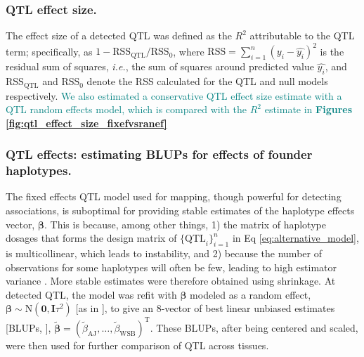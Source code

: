 \documentclass[9pt,twocolumn,twoside]{gsajnl}
\newcommand{\ie}{\emph{i.e.}\xspace}
\newcommand{\T}{^\mathrm{T}}
\newcommand{\bbeta}{\boldsymbol{\beta}}
\newcommand{\blup}{\widetilde{\bbeta}}
\newcommand{\bzero}{\mathbf{0}}
\newcommand{\bI}{\mathbf{I}}
\newcommand{\tausq}{\tau^{2}}
\newcommand{\WV}[2]{\textcolor{red}{#1\footnote{\textcolor{red}{WV: #2}}}}
\newcommand{\GKinline}[1]{\textcolor{teal}{#1}}
\begin{document}

\subsubsection{QTL effect size.}

The effect size of a detected QTL was defined as the $R^2$ attributable to the QTL term; specifically, as $1-\text{RSS}_\text{QTL} / \text{RSS}_0$, where $\text{RSS} = \sum_{i = 1}^{n}(y_{i} - \widehat{y_{i}})^{2}$ is the residual sum of squares, \ie, the sum of squares around predicted value $\widehat{y_i}$, and $\text{RSS}_{\text{QTL}}$ and $\text{RSS}_0$ denote the RSS calculated for the QTL and null models respectively. \GKinline{We also estimated a conservative QTL effect size estimate with a QTL random effects model, which is compared with the $R^{2}$ estimate in \textbf{Figures \ref{fig:qtl_effect_size_fixefvsranef}}}

\subsubsection{QTL effects: estimating BLUPs for effects of founder haplotypes.} 

The fixed effects QTL model used for mapping, though powerful for detecting associations, is suboptimal for providing stable estimates of the haplotype effects vector, $\bbeta$. This is because, among other things, 1) the matrix of haplotype dosages that forms the design matrix of $\{\text{QTL}_i\}^n_{i=1}$ in Eq \ref{eq:alternative_model}, is multicollinear, which leads to instability, and 2) because the number of observations for some haplotypes will often be few, leading to high estimator variance \citep{Zhang2014}. More stable estimates were therefore obtained using shrinkage. At detected QTL, the model was refit with $\bbeta$ modeled as a random effect, $\bbeta \sim \text{N}(\bzero, \bI\tausq)$ [as in \citet{Wei2016}], to give an 8-vector of best linear unbiased estimates [BLUPs, \citet{Robinson1991}], $\blup=(\widetilde{\beta}_\text{AJ},\dots,\widetilde{\beta}_\text{WSB})\T$. These BLUPs, after being centered and scaled, were then used for further comparison of QTL across tissues. 
\end{document}
